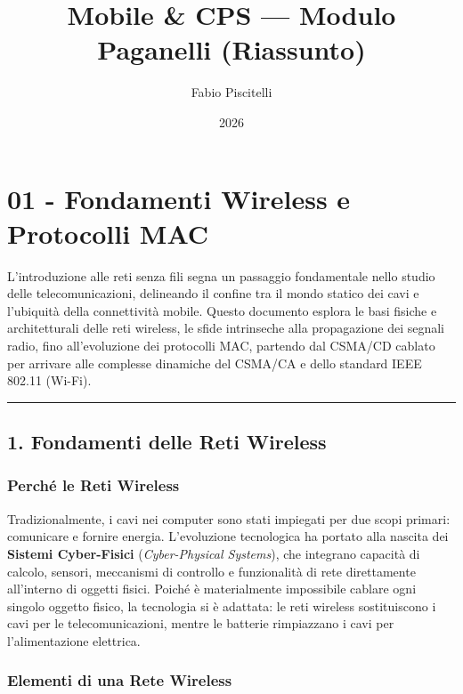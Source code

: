 \documentclass[
  italian,
  openany]{book}
\title{Mobile \& CPS --- Modulo Paganelli (Riassunto)}
\author{Fabio Piscitelli}
\date{2026}
\begin{document}
\frontmatter
\maketitle

{
\setcounter{tocdepth}{1}
\tableofcontents
}
\mainmatter
\chapter{01 - Fondamenti Wireless e Protocolli
MAC}\label{fondamenti-wireless-e-protocolli-mac}

L'introduzione alle reti senza fili segna un passaggio fondamentale
nello studio delle telecomunicazioni, delineando il confine tra il mondo
statico dei cavi e l'ubiquità della connettività mobile. Questo
documento esplora le basi fisiche e architetturali delle reti wireless,
le sfide intrinseche alla propagazione dei segnali radio, fino
all'evoluzione dei protocolli MAC, partendo dal CSMA/CD cablato per
arrivare alle complesse dinamiche del CSMA/CA e dello standard IEEE
802.11 (Wi-Fi).

\begin{center}\rule{0.5\linewidth}{0.5pt}\end{center}

\section{1. Fondamenti delle Reti
Wireless}\label{fondamenti-delle-reti-wireless}

\subsection{Perché le Reti Wireless}\label{perchuxe9-le-reti-wireless}

Tradizionalmente, i cavi nei computer sono stati impiegati per due scopi
primari: comunicare e fornire energia. L'evoluzione tecnologica ha
portato alla nascita dei \textbf{Sistemi Cyber-Fisici}
(\emph{Cyber-Physical Systems}), che integrano capacità di calcolo,
sensori, meccanismi di controllo e funzionalità di rete direttamente
all'interno di oggetti fisici. Poiché è materialmente impossibile
cablare ogni singolo oggetto fisico, la tecnologia si è adattata: le
reti wireless sostituiscono i cavi per le telecomunicazioni, mentre le
batterie rimpiazzano i cavi per l'alimentazione elettrica.

\subsection{Elementi di una Rete
Wireless}\label{elementi-di-una-rete-wireless}
\end{document}
